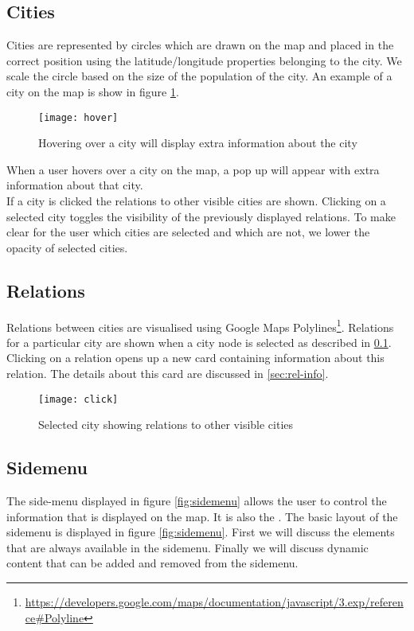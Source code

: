\subsection{Cities}\label{sec:city}
Cities are represented by circles which are drawn on the map and placed in the correct position using the latitude/longitude properties belonging to the city. We scale the circle based on the size of the population of the city. An example of a city on the map is show in figure \ref{fig:map-city}.

\begin{figure}[H]
  \centering
  \texttt{[image: hover]}
  \caption{Hovering over a city will display extra information about the city}
  \label{fig:map-city}
\end{figure}

When a user hovers over a city on the map, a pop up will appear with extra information about that city.\\
If a city is clicked the relations to other visible cities are shown. Clicking on a selected city toggles the visibility of the previously displayed relations. To make clear for the user  which cities are selected and which are not, we lower the opacity of selected cities.

\subsection{Relations}

Relations between cities are visualised using Google Maps Polylines\footnote{\url{https://developers.google.com/maps/documentation/javascript/3.exp/reference#Polyline}}. Relations for a particular city are shown when a city node is selected as described in \ref{sec:city}.\\
Clicking on a relation opens up a new card containing information about this relation. The details about this card are discussed in \ref{sec:rel-info}.

\begin{figure}[H]
  \centering
  \texttt{[image: click]}
  \caption{Selected city showing relations to other visible cities}
  \label{fig:sub2}
\end{figure}

\subsection{Sidemenu}

The side-menu displayed in figure \ref{fig:sidemenu} allows the user to control the information that is displayed on the map. It is also the . The basic layout of the sidemenu is displayed in figure \ref{fig:sidemenu}. First we will discuss the elements that are always available in the sidemenu. Finally we will discuss dynamic content that can be added and removed from the sidemenu.

